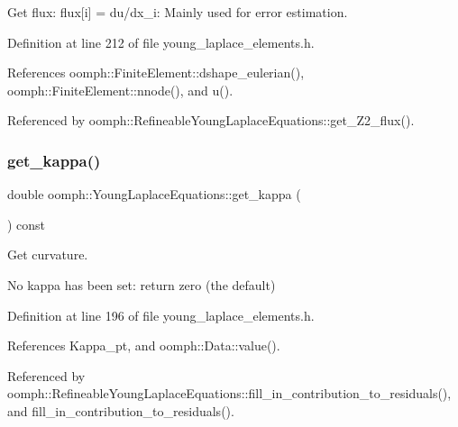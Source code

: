 Get flux\+: flux\mbox{[}i\mbox{]} = du/dx\+\_\+i\+: Mainly used for error estimation. 



Definition at line 212 of file young\+\_\+laplace\+\_\+elements.\+h.



References oomph\+::\+Finite\+Element\+::dshape\+\_\+eulerian(), oomph\+::\+Finite\+Element\+::nnode(), and u().



Referenced by oomph\+::\+Refineable\+Young\+Laplace\+Equations\+::get\+\_\+\+Z2\+\_\+flux().

\mbox{\label{classoomph_1_1YoungLaplaceEquations_aa4144104f99e731a0e40ad4ced7f5e8e}} 
\subsubsection{\texorpdfstring{get\+\_\+kappa()}{get\_kappa()}}
{\footnotesize\ttfamily double oomph\+::\+Young\+Laplace\+Equations\+::get\+\_\+kappa (\begin{DoxyParamCaption}{ }\end{DoxyParamCaption}) const\hspace{0.3cm}{\ttfamily [inline]}}



Get curvature. 

No kappa has been set\+: return zero (the default) 

Definition at line 196 of file young\+\_\+laplace\+\_\+elements.\+h.



References Kappa\+\_\+pt, and oomph\+::\+Data\+::value().



Referenced by oomph\+::\+Refineable\+Young\+Laplace\+Equations\+::fill\+\_\+in\+\_\+contribution\+\_\+to\+\_\+residuals(), and fill\+\_\+in\+\_\+contribution\+\_\+to\+\_\+residuals().

\mbox{\label{classoomph_1_1YoungLaplaceEquations_a08376fdfe31361bee2ba0d21f9b132ec}} 
